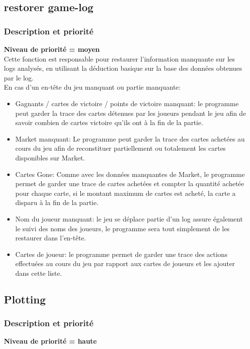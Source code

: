 \documentclass{scrreprt}
\begin{document}
\subsection{restorer game-log}
\subsubsection{Description et priorité}
\textbf{Niveau de priorité = moyen}\\

Cette fonction est responsable pour restaurer l'information manquante sur les logs analysés, en utilisant la déduction basique sur la base des données obtenues par le log.\\
En cas d'un en-tête du jeu manquant ou partie manquante:
  \begin{itemize}
\item Gagnants / cartes de victoire / points de victoire manquant: le programme peut garder la trace des cartes détenues par les joueurs pendant le jeu afin de savoir combien de cartes victoire qu'ils ont à la fin de la partie.
\item Market manquant: Le programme peut garder la trace des cartes achetées au cours du jeu afin de reconstituer partiellement ou totalement les cartes disponibles sur Market.
\item Cartes Gone: Comme avec les données manquantes de Market, le programme permet de garder une trace de cartes achetées et compter la quantité achetée pour chaque carte, si le montant maximum de cartes est acheté, la carte a disparu à la fin de la partie.
\item Nom du joueur manquant: le jeu se déplace partie d'un log assure également le suivi des noms des joueurs, le programme sera tout simplement de les restaurer dans l'en-tête.
\item Cartes de joueur: le programme permet de garder une trace des actions effectuées au cours du jeu par rapport aux cartes de joueurs et les ajouter dans cette liste.
  \end{itemize}

\subsection{Plotting}
\subsubsection{Description et priorité}
\textbf{Niveau de priorité = haute}\\
\end{document}
